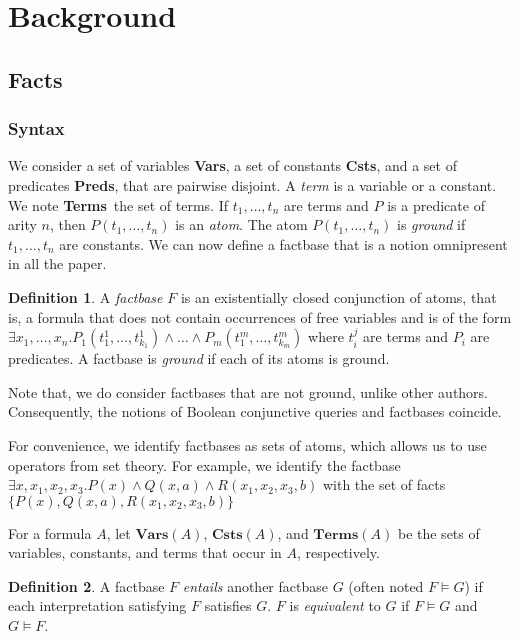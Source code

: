 \documentclass{article}
\theoremstyle{definition}
\newtheorem{definition}{Definition}[section]
\theoremstyle{remark}
\newcommand{\Vars}{\textbf{Vars}}
\newcommand{\Terms}{\textbf{Terms}}
\newcommand{\Preds}{\textbf{Preds}}
\newcommand{\Csts}{\textbf{Csts}}
\begin{document}
\section{Background}


\subsection{Facts}

\subsubsection{Syntax}

We consider a set of variables \Vars, a set of constants \Csts, and a set of predicates \Preds, that are pairwise disjoint. A \emph{term} is a variable or a constant. We note \Terms\ the set of terms. If $t_1,\ldots,t_n$ are terms and $P$ is a predicate of arity $n$, then $P(t_{1},\ldots,t_{n})$ is an \emph{atom}. The atom $P(t_{1},\ldots,t_{n})$ is \emph{ground} if $t_1,\ldots,t_n$ are constants. We can now define a factbase that is a notion omnipresent in all the paper.  


\begin{definition}
A \emph{factbase} $F$ is an existentially closed conjunction of atoms, that is, a formula that does not contain occurrences of free variables and is of the form $\exists x_{1},\ldots,x_{n}.P_{1}(t_{1}^{1},\ldots,t_{k_{1}}^{1})\land \ldots\land P_{m}(t_{1}^{m},\ldots,t_{k_{m}}^{m})$ where $t_i^j$ are terms and $P_i$ are predicates. A factbase is \emph{ground} if each of its atoms is ground.
\end{definition}

Note that, we do consider factbases that are not ground, unlike other authors. Consequently, the notions of Boolean conjunctive queries and factbases coincide.

For convenience, we identify factbases as sets of atoms, which allows us to  use operators from set theory. For example, we identify the factbase $\exists x,x_{1},x_{2},x_{3}. P(x) \land Q(x,a) \land R(x_{1},x_{2},x_{3},b)$ with the set of facts $\{P(x),Q(x,a),R(x_{1},x_{2},x_{3},b)\}$

For a formula $A$, let \emph{$\Vars(A)$}, \emph{$\Csts(A)$}, and \emph{$\Terms(A)$} be the sets of variables, constants, and terms that occur in $A$, respectively.

\begin{definition}
A factbase $F$ \emph{entails} another factbase $G$ (often noted $F \models G$) if each interpretation satisfying $F$ satisfies $G$. $F$ is \emph{equivalent} to $G$ if $F \models G$ and $G \models F$.
\end{definition}
\end{document}
